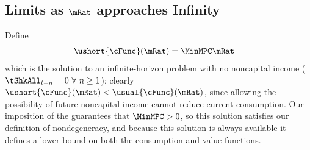 \documentclass[BufferStockTheory]{subfiles}
\begin{document}
\begin{comment}
  Third (Figure~\ref{fig:cGroTargetFig}), there are two special values of $\mRat$, which we will call the `individual balanced growth' point $\mStE$ because it is the point where expected consumption growth and expected permanent income growth are balanced, and the `individual target' $\mTrg$ such that if $\mRat_t = \mTrg$ then $\Ex_t [{\mRat}_{t+1}] = \mRat_t$.  %
  of permanent noncapital income.  (The individual consumer does not expect `balanced growth' at $\mTrg$).

  The final proposition suggested by Figure~\ref{fig:cGroTargetFig} is that the expected consumption growth factor is declining in the level of the cash-on-hand ratio $\mRat_{t}$.  This turns out to be true in the absence of permanent shocks, but in extreme cases it can be false if permanent shocks are present.\footnote{Throughout the remaining analysis I make a final assumption that is not strictly justified by the foregoing.  We have seen that the finite-horizon consumption functions $\usual{\cFunc}_{T-n}(\mRat)$ are twice continuously differentiable and strictly concave, and that they converge to a continuous function $\usual{\cFunc}(\mRat)$.  It does not strictly follow that the limiting function $\usual{\cFunc}(\mRat)$ is twice continuously differentiable, but I will assume that it is.}
\end{comment}

\renewcommand{\figFile}{cGroTargetFig}
\hypertarget{\figFile}{}


\hypertarget{LimitsAsmtToInfty}{}
\subsection{Limits as \texorpdfstring{$\mRat$}{m} approaches Infinity}\label{subsec:LimitsAsmtToInfty}

Define
\begin{align*}
  \ushort{\cFunc}(\mRat)  & = \MinMPC \mRat
\end{align*}
which is the solution to an infinite-horizon problem with no noncapital income ($\tShkAll_{t+n} = 0~\forall~n\geq1$); clearly $\ushort{\cFunc}(\mRat) < \usual{\cFunc}(\mRat)$, since allowing the possibility of future noncapital income cannot reduce current consumption.  Our imposition of the {\RIC} guarantees that $\MinMPC > 0$, so this solution satisfies our definition of nondegeneracy, and because this solution is always available it defines a lower bound on both the consumption and value functions.%
\end{document}
